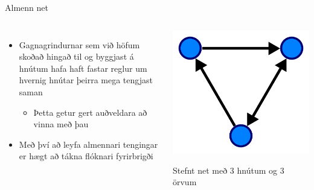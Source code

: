 \documentclass{beamer}
\begin{document}
\begin{frame}{Almenn net}
\begin{columns}
\begin{itemize}
 \item Gagnagrindurnar sem við höfum skoðað hingað til og byggjast á hnútum hafa haft fastar reglur um hvernig hnútar þeirra mega tengjast saman 
 \begin{itemize}
  \item Þetta getur gert auðveldara að vinna með þau
 \end{itemize}
 \item Með því að leyfa almennari tengingar er hægt að tákna flóknari fyrirbrigði
\end{itemize}
\begin{center}
\includegraphics[width=\linewidth]{Pics/directed}

Stefnt net með 3 hnútum og 3 örvum 
\end{center}
\end{columns}
\end{frame}
\end{document}
